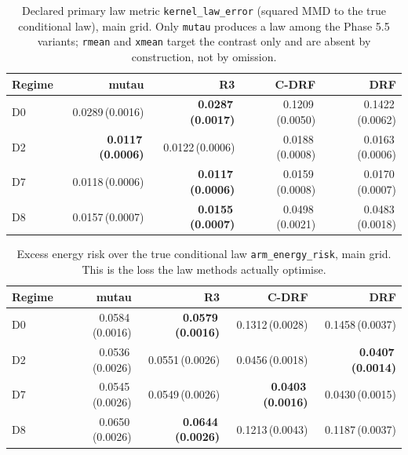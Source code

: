 \begin{table}[htbp]
\centering
\caption{Declared primary law metric \texttt{kernel\_law\_error} (squared MMD to the true conditional law), main grid. Only \texttt{mutau} produces a law among the Phase 5.5 variants; \texttt{rmean} and \texttt{xmean} target the contrast only and are absent by construction, not by omission.}
\label{tab:p55-kernel}
\scriptsize
\setlength{\tabcolsep}{3.2pt}
\begin{tabular}{@{}lrrrr@{}}
\toprule
Regime & mutau & R3 & C-DRF & DRF \\
\midrule
D0 & 0.0289\,(0.0016) & \textbf{0.0287\,(0.0017)} & 0.1209\,(0.0050) & 0.1422\,(0.0062) \\
D2 & \textbf{0.0117\,(0.0006)} & 0.0122\,(0.0006) & 0.0188\,(0.0008) & 0.0163\,(0.0006) \\
D7 & 0.0118\,(0.0006) & \textbf{0.0117\,(0.0006)} & 0.0159\,(0.0008) & 0.0170\,(0.0007) \\
D8 & 0.0157\,(0.0007) & \textbf{0.0155\,(0.0007)} & 0.0498\,(0.0021) & 0.0483\,(0.0018) \\
\bottomrule
\end{tabular}
\end{table}

\begin{table}[htbp]
\centering
\caption{Excess energy risk over the true conditional law \texttt{arm\_energy\_risk}, main grid. This is the loss the law methods actually optimise.}
\label{tab:p55-energy}
\scriptsize
\setlength{\tabcolsep}{3.2pt}
\begin{tabular}{@{}lrrrr@{}}
\toprule
Regime & mutau & R3 & C-DRF & DRF \\
\midrule
D0 & 0.0584\,(0.0016) & \textbf{0.0579\,(0.0016)} & 0.1312\,(0.0028) & 0.1458\,(0.0037) \\
D2 & 0.0536\,(0.0026) & 0.0551\,(0.0026) & 0.0456\,(0.0018) & \textbf{0.0407\,(0.0014)} \\
D7 & 0.0545\,(0.0026) & 0.0549\,(0.0026) & \textbf{0.0403\,(0.0016)} & 0.0430\,(0.0015) \\
D8 & 0.0650\,(0.0026) & \textbf{0.0644\,(0.0026)} & 0.1213\,(0.0043) & 0.1187\,(0.0037) \\
\bottomrule
\end{tabular}
\end{table}

